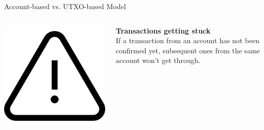 \documentclass[handout]{beamer}
\begin{document}
\begin{frame}{Account-based vs. UTXO-based Model}
	\begin{columns}[T]
		\begin{column}{0.25\textwidth}
			\center
			\includegraphics[scale=0.1]{../assets/images/alert.png}
		\end{column}
		\begin{column}{0.8\textwidth}
			\textbf{Transactions getting stuck}\\
			If a transaction from an account has not been confirmed yet, subsequent ones from the same account won't get through.
		\end{column}
	\end{columns}
	\vspace{2em}
\end{frame}
\end{document}
